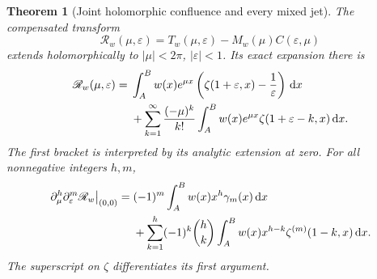 \documentclass[11pt,letterpaper]{article}
\numberwithin{equation}{section}
\newtheorem{theorem}{Theorem}[section]
\theoremstyle{definition}
\theoremstyle{remark}\newtheorem{remark}[theorem]{Remark}
\newcommand{\dd}{\,\mathrm d}
\begin{document}
\begin{theorem}[Joint holomorphic confluence and every mixed jet]
\label{pls:thm:confluence}
The compensated transform
\begin{equation}\label{pls:eq:Rwdef}
 \mathscr R_w(\mu,\varepsilon)
     =T_w(\mu,\varepsilon)-M_w(\mu)C(\varepsilon,\mu)
\end{equation}
extends holomorphically to
$|\mu|<2\pi$, $|\varepsilon|<1$. Its exact expansion there is
\begin{align}
 \mathscr R_w(\mu,\varepsilon)
 ={}&\int_A^B w(x)e^{\mu x}
               \left(\zeta(1+\varepsilon,x)-\frac1\varepsilon\right)
                                                       \dd x\notag\\
 &+\sum_{k=1}^\infty\frac{(-\mu)^k}{k!}
       \int_A^B w(x)e^{\mu x}\zeta(1+\varepsilon-k,x)\dd x.
                                      \label{pls:eq:Rwseries}
\end{align}
The first bracket is interpreted by its analytic extension at zero.
For all nonnegative integers $h,m$,
\begin{align}
 \left.\partial_\mu^h\partial_\varepsilon^m
                      \mathscr R_w\right|_{(0,0)}
 ={}&(-1)^m\int_A^B w(x)x^h\gamma_m(x)\dd x\notag\\
 &+\sum_{k=1}^h(-1)^k\binom hk
     \int_A^B w(x)x^{h-k}\zeta^{(m)}(1-k,x)\dd x.
                                      \label{pls:eq:mixedjets}
\end{align}
The superscript on $\zeta$ differentiates its first argument.
\end{theorem}
\end{document}
